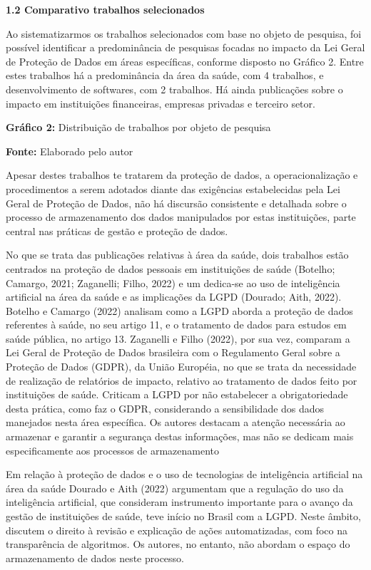  \textbf{\textbf{1.2 Comparativo trabalhos selecionados}}

Ao sistematizarmos os trabalhos selecionados com base no objeto de pesquisa, foi possível identificar a predominância de pesquisas focadas no impacto da Lei Geral de Proteção de Dados em áreas específicas, conforme disposto no Gráfico 2. Entre estes trabalhos há a predominância da área da saúde, com 4 trabalhos, e desenvolvimento de softwares, com 2 trabalhos. Há ainda publicações sobre o impacto em instituições financeiras, empresas privadas e terceiro setor.

 \textbf{\textbf{Gráfico 2: }}Distribuição de trabalhos por objeto de pesquisa

 \textbf{\textbf{Fonte: }}Elaborado pelo autor

 Apesar destes trabalhos te tratarem da proteção de dados, a operacionalização e procedimentos a serem adotados diante das exigências estabelecidas pela Lei Geral de Proteção de Dados, não há discursão consistente e detalhada sobre o processo de armazenamento dos dados manipulados por estas instituições, parte central nas práticas de gestão e proteção de dados. 

No que se trata das publicações relativas à área da saúde, dois trabalhos estão centrados na proteção de dados pessoais em instituições de saúde (Botelho; Camargo, 2021; Zaganelli; Filho, 2022) e um dedica-se ao uso de inteligência artificial na área da saúde e as implicações da LGPD (Dourado; Aith, 2022). Botelho e Camargo (2022) analisam como a LGPD aborda a proteção de dados referentes à saúde, no seu artigo 11, e o tratamento de dados para estudos em saúde pública, no artigo 13. Zaganelli e Filho (2022), por sua vez, comparam a Lei Geral de Proteção de Dados brasileira com o Regulamento Geral sobre a Proteção de Dados (GDPR), da União Européia, no que se trata da necessidade de realização de relatórios de impacto, relativo ao tratamento de dados feito por instituições de saúde. Criticam a LGPD por não estabelecer a obrigatoriedade desta prática, como faz o GDPR, considerando a sensibilidade dos dados manejados nesta área específica. Os autores destacam a atenção necessária ao armazenar e garantir a segurança destas informações, mas não se dedicam mais especificamente aos processos de armazenamento

Em relação à proteção de dados e o uso de tecnologias de inteligência artificial na área da saúde Dourado e Aith (2022) argumentam que a regulação do uso da inteligência artificial, que consideram instrumento importante para o avanço da gestão de instituições de saúde, teve início no Brasil com a LGPD. Neste âmbito, discutem o direito à revisão e explicação de ações automatizadas, com foco na transparência de algoritmos. Os autores, no entanto, não abordam o espaço do armazenamento de dados neste processo. 

